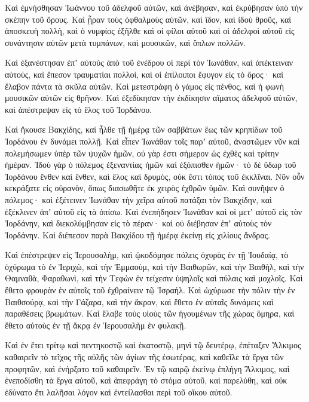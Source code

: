 {Καὶ ἐμνήσθησαν Ἰωάννου τοῦ ἀδελφοῦ αὐτῶν, καὶ ἀνέβησαν, καὶ ἐκρύβησαν ὑπὸ τὴν σκέπην τοῦ ὄρους.
Καὶ ᾖραν τοὺς ὀφθαλμοὺς αὐτῶν, καὶ ἴδον, καὶ ἰδοὺ θροῦς, καὶ ἀποσκευὴ πολλὴ, καὶ ὁ νυμφίος ἐξῆλθε καὶ οἱ φίλοι αὐτοῦ καὶ οἱ ἀδελφοὶ αὐτοῦ εἰς συνάντησιν αὐτῶν μετὰ τυμπάνων, καὶ μουσικῶν, καὶ ὅπλων πολλῶν.
\par }{\PP {}Καὶ ἐξανέστησαν ἐπʼ αὐτοὺς ἀπὸ τοῦ ἐνέδρου οἱ περὶ τὸν Ἰωνάθαν, καὶ ἀπέκτειναν αὐτοὺς, καὶ ἔπεσον τραυματίαι πολλοὶ, καὶ οἱ ἐπίλοιποι ἔφυγον εἰς τὸ ὄρος· καὶ ἔλαβον πάντα τὰ σκῦλα αὐτῶν.
Καὶ μετεστράφη ὁ γάμος εἰς πένθος, καὶ ἡ φωνὴ μουσικῶν αὐτῶν εἰς θρῆνον.
Καὶ ἐξεδίκησαν τὴν ἐκδίκησιν αἵματος ἀδελφοῦ αὐτῶν, καὶ ἀπέστρεψαν εἰς τὸ ἕλος τοῦ Ἰορδάνου.
\par }{\PP {}Καὶ ἤκουσε Βακχίδης, καὶ ἦλθε τῇ ἡμέρᾳ τῶν σαββάτων ἕως τῶν κρηπίδων τοῦ Ἰορδάνου ἐν δυνάμει πολλῇ.
Καὶ εἶπεν Ἰωνάθαν τοῖς παρʼ αὐτοῦ, ἀναστῶμεν νῦν καὶ πολεμήσωμεν ὑπὲρ τῶν ψυχῶν ἡμῶν, οὐ γὰρ ἐστι σήμερον ὡς ἐχθὲς καὶ τρίτην ἡμέραν.
Ἰδοὺ γὰρ ὁ πόλεμος ἐξεναντίας ἡμῶν καὶ ἐξόπισθεν ἡμῶν· τὸ δὲ ὕδωρ τοῦ Ἰορδάνου ἔνθεν καὶ ἔνθεν, καὶ ἕλος καὶ δρυμὸς, οὐκ ἔστι τόπος τοῦ ἐκκλῖναι.
Νῦν οὖν κεκράξατε εἰς οὐρανὸν, ὅπως διασωθῆτε ἐκ χειρὸς ἐχθρῶν ὑμῶν.
Καὶ συνῆψεν ὁ πόλεμος· καὶ ἐξέτεινεν Ἰωνάθαν τὴν χεῖρα αὐτοῦ πατάξαι τὸν Βακχίδην, καὶ ἐξέκλινεν ἀπʼ αὐτοῦ εἰς τὰ ὀπίσω.
Καὶ ἐνεπήδησεν Ἰωνάθαν καὶ οἱ μετʼ αὐτοῦ εἰς τὸν Ἰορδάνην, καὶ διεκολύμβησαν εἰς τὸ πέραν· καὶ οὐ διέβησαν ἐπʼ αὐτοὺς τὸν Ἰορδάνην.
Καὶ διέπεσον παρὰ Βακχίδου τῇ ἡμέρᾳ ἐκείνῃ εἰς χιλίους ἄνδρας.
\par }{\PP {}Καὶ ἐπέστρεψεν εἰς Ἱερουσαλὴμ, καὶ ᾠκοδόμησε πόλεις ὀχυρὰς ἐν τῇ Ἰουδαίᾳ, τὸ ὀχύρωμα τὸ ἐν Ἱεριχὼ, καὶ τὴν Ἐμμαοὺμ, καὶ τὴν Βαιθωρῶν, καὶ τὴν Βαιθὴλ, καὶ τὴν Θαμναθὰ, Φαραθωνὶ, καὶ τὴν Τεφὼν ἐν τείχεσιν ὑψηλοῖς καὶ πύλαις καὶ μοχλοῖς.
Καὶ ἔθετο φρουρὰν ἐν αὐτοῖς τοῦ ἐχθραίνειν τῷ Ἰσραήλ.
Καὶ ὠχύρωσε τὴν πόλιν τὴν ἐν Βαιθσούρᾳ, καὶ τὴν Γάζαρα, καὶ τὴν ἄκραν, καὶ ἔθετο ἐν αὐταῖς δυνάμεις καὶ παραθέσεις βρωμάτων.
Καὶ ἔλαβε τοὺς υἱοὺς τῶν ἡγουμένων τῆς χώρας ὅμηρα, καὶ ἔθετο αὐτοὺς ἐν τῇ ἄκρᾳ ἐν Ἱερουσαλὴμ ἐν φυλακῇ.
\par }{\PP {}Καὶ ἐν ἔτει τρίτῳ καὶ πεντηκοστῷ καὶ ἑκατοστῷ, μηνὶ τῷ δευτέρῳ, ἐπέταξεν Ἄλκιμος καθαιρεῖν τὸ τεῖχος τῆς αὐλῆς τῶν ἁγίων τῆς ἐσωτέρας, καὶ καθεῖλε τὰ ἔργα τῶν προφητῶν, καὶ ἐνήρξατο τοῦ καθαιρεῖν.
Ἐν τῷ καιρῷ ἐκείνῳ ἐπλήγη Ἄλκιμος, καὶ ἐνεποδίσθη τὰ ἔργα αὐτοῦ, καὶ ἀπεφράγη τὸ στόμα αὐτοῦ, καὶ παρελύθη, καὶ οὐκ ἐδύνατο ἔτι λαλῆσαι λόγον καὶ ἐντείλασθαι περὶ τοῦ οἴκου αὐτοῦ.
}
